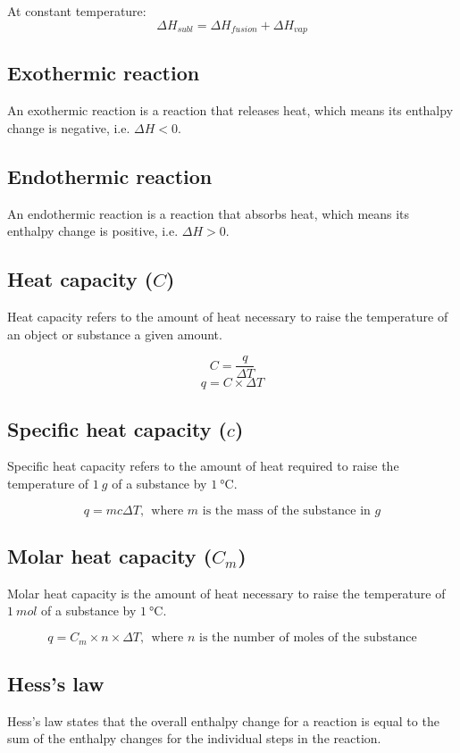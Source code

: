 \documentclass[11pt]{article}
\begin{document}
At constant temperature:
\[\Delta H_{subl} = \Delta H_{fusion} + \Delta H_{vap}\]

\subsection{Exothermic reaction}
\label{sec:orgaddae7f}
An exothermic reaction is a reaction that releases heat, which means its enthalpy change is negative, i.e. \(\Delta H < 0\).

\subsection{Endothermic reaction}
\label{sec:org0a4625e}
An endothermic reaction is a reaction that absorbs heat, which means its enthalpy change is positive, i.e. \(\Delta H > 0\).

\subsection{Heat capacity (\(C\))}
\label{sec:org7def809}
Heat capacity refers to the amount of heat necessary to raise the temperature of an object or substance a given amount.

\[C = \frac{q}{\Delta T}\]
\[q = C \times \Delta T\]

\subsection{Specific heat capacity (\(c\))}
\label{sec:org8c92e57}
Specific heat capacity refers to the amount of heat required to raise the temperature of \(\qty{1}{\unit{g}}\) of a substance by \(\qty{1}{\unit{\degreeCelsius}}\).

\[q = mc \Delta T, \ \ \text{where } m \text{ is the mass of the substance in } \unit{g}\]

\subsection{Molar heat capacity (\(C_m\))}
\label{sec:orgbb7f6eb}
Molar heat capacity is the amount of heat necessary to raise the temperature of \(\qty{1}{\unit{mol}}\) of a substance by \(\qty{1}{\unit{\degreeCelsius}}\).

\[q = C_m \times n \times \Delta T, \ \ \text{where } n \text{ is the number of moles of the substance}\]

\subsection{Hess's law}
\label{sec:org24eb0df}
Hess's law states that the overall enthalpy change for a reaction is equal to the sum of the enthalpy changes for the individual steps in the reaction.
\\[0pt]
\end{document}
